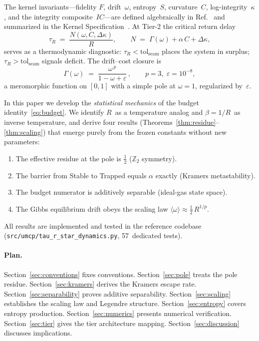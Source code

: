 \documentclass[
  aps,
  prd,
  twocolumn,
  showpacs,
  superscriptaddress,
  nofootinbib,
  floatfix
]{revtex4-2}
\newcommand{\tR}{\tau_{\!R}}
\newcommand{\Gam}{\Gamma}
\newcommand{\eps}{\varepsilon}
\newcommand{\tolseam}{\mathrm{tol}_{\mathrm{seam}}}
\newcommand{\beq}{\begin{equation}}
\newcommand{\eeq}{\end{equation}}
\begin{document}
The kernel invariants---fidelity $F$, drift~$\omega$, entropy~$S$,
curvature~$C$, log-integrity~$\kappa$, and the integrity
composite~$IC$---are defined algebraically in
Ref.~\cite{paulus2025physicscoherence}
and summarized in the Kernel Specification~\cite{umcpmetadatarepo}.
At Tier-2 the critical return delay
\beq\label{eq:budget}
  \tR \;=\; \frac{N(\omega,C,\Delta\kappa)}{R},
  \qquad
  N \;=\; \Gam(\omega) + \alpha\,C + \Delta\kappa,
\eeq
serves as a thermodynamic diagnostic: $\tR < \tolseam$ places the
system in surplus; $\tR > \tolseam$ signals deficit.
The drift--cost closure is
\beq\label{eq:gamma}
  \Gam(\omega) \;=\; \frac{\omega^{\,p}}{1-\omega+\eps}\,,
  \qquad p=3,\;\eps=10^{-8},
\eeq
a meromorphic function on $[0,1]$ with a simple pole at
$\omega=1$, regularized by~$\eps$.

In this paper we develop the \emph{statistical mechanics} of the
budget identity~\eqref{eq:budget}.  We identify $R$~as a temperature
analog and $\beta=1/R$~as inverse temperature, and derive four
results (Theorems~\ref{thm:residue}--\ref{thm:scaling}) that emerge
purely from the frozen constants without new parameters:
\begin{enumerate}
  \item The effective residue at the pole is $\tfrac{1}{2}$
        ($\mathbb{Z}_2$ symmetry).
  \item The barrier from Stable to Trapped equals $\alpha$ exactly
        (Kramers metastability).
  \item The budget numerator is additively separable (ideal-gas
        state space).
  \item The Gibbs equilibrium drift obeys the scaling law
        $\langle\omega\rangle\approx\tfrac{1}{2}\,R^{1/p}$.
\end{enumerate}
All results are implemented and tested in the reference codebase
(\texttt{src/umcp/tau\_r\_star\_dynamics.py}, 57~dedicated tests).

\paragraph{Plan.}
Section~\ref{sec:conventions} fixes conventions.
Section~\ref{sec:pole} treats the pole residue.
Section~\ref{sec:kramers} derives the Kramers escape rate.
Section~\ref{sec:separability} proves additive separability.
Section~\ref{sec:scaling} establishes the scaling law and
Legendre structure.
Section~\ref{sec:entropy} covers entropy production.
Section~\ref{sec:numerics} presents numerical verification.
Section~\ref{sec:tier} gives the tier architecture mapping.
Section~\ref{sec:discussion} discusses implications.
\end{document}
